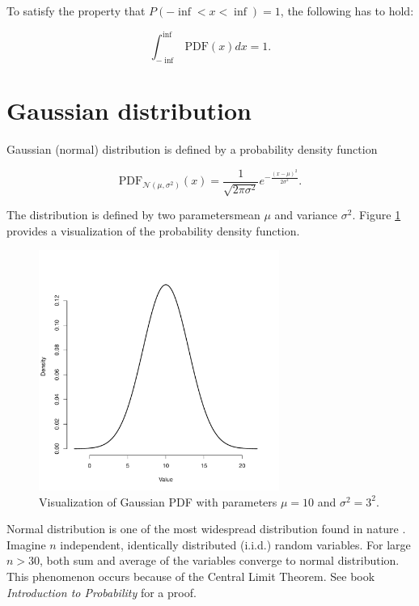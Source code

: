 \documentclass[thesis=B,english]{FITthesis}[2012/06/26]
\begin{document}
To satisfy the property that $P(-\inf < x < \inf) = 1$, the following has to hold:

\begin{equation*}
\int_{-\inf}^{\inf} \text{PDF}(x) dx = 1.
\end{equation*}

\section{Gaussian distribution}

Gaussian (normal) distribution is defined by a probability density function

\begin{equation*}
\text{PDF}_{\mathcal{N}(\mu,\sigma^2)}(x) = \frac{1}{\sqrt{2 \pi \sigma^2}}e^{-\frac{(x-\mu)^2}{2 \sigma^2}}.
\end{equation*}

The distribution is defined by two parameters\textemdash mean $\mu$ and variance $\sigma^2$. Figure \ref{fig:gaussian} provides a visualization of the probability density function.

\begin{figure}
	\centering
 	\includegraphics[width=0.7\textwidth]{gaussian}
 	\caption{Visualization of Gaussian PDF with parameters $\mu=10$ and $\sigma^2=3^2$.}
 	\label{fig:gaussian}
\end{figure}

Normal distribution is one of the most widespread distribution found in nature \cite{gaussian-distribution-widespread}. Imagine $n$ independent, identically distributed (i.i.d.) random variables. For large $n > 30$, both sum and average of the variables converge to normal distribution. This phenomenon occurs because of the Central Limit Theorem. See book \textit{Introduction to Probability} \cite{clt-proof} for a proof.
\end{document}
